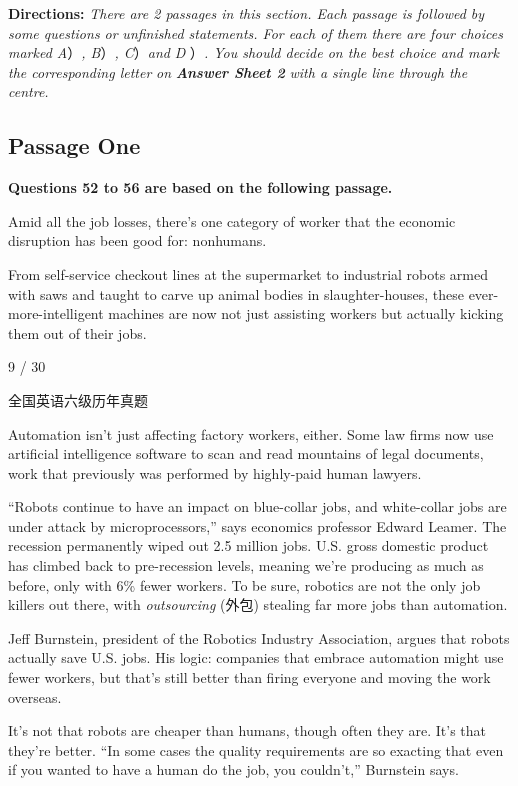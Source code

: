 \documentclass[UTF8,11pt]{ctexart}
\begin{document}
\textbf{Directions:}\textit{ There are 2 passages in this section. Each passage is followed by some questions or} \textit{unfinished statements. For each of them there are four choices marked A}）\textit{, B}）\textit{, C}）\textit{and} \textit{D} ）\textit{. You should decide on the best choice and mark the corresponding letter} \textit{on}\textbf{\textit{ Answer Sheet 2}}\textit{ with a single line through the centre.}


\subsection*{\textbf{Passage One}}


\textbf{Questions 52 to 56 are based on the following passage.}


Amid all the job losses, there’s one category of worker that the economic disruption has been good for: nonhumans.


From self-service checkout lines at the supermarket to industrial robots armed with saws and taught to carve up animal bodies in slaughter-houses, these ever-more-intelligent machines are now not just assisting workers but actually kicking them out of their jobs.


9 / 30


全国英语六级历年真题


Automation isn’t just affecting factory workers, either. Some law firms now use artificial intelligence software to scan and read mountains of legal documents, work that previously was performed by highly-paid human lawyers.


“Robots continue to have an impact on blue-collar jobs, and white-collar jobs are under attack by microprocessors,” says economics professor Edward Leamer. The recession permanently wiped out 2.5 million jobs. U.S. gross domestic product has climbed back to pre-recession levels, meaning we’re producing as much as before, only with 6\% fewer workers. To be sure, robotics are not the only job killers out there, with\textit{ outsourcing} (外包) stealing far more jobs than automation.


Jeff Burnstein, president of the Robotics Industry Association, argues that robots actually save U.S. jobs. His logic: companies that embrace automation might use fewer workers, but that’s still better than firing everyone and moving the work overseas.


It’s not that robots are cheaper than humans, though often they are. It’s that they’re better. “In some cases the quality requirements are so exacting that even if you wanted to have a human do the job, you couldn’t,” Burnstein says.
\end{document}
